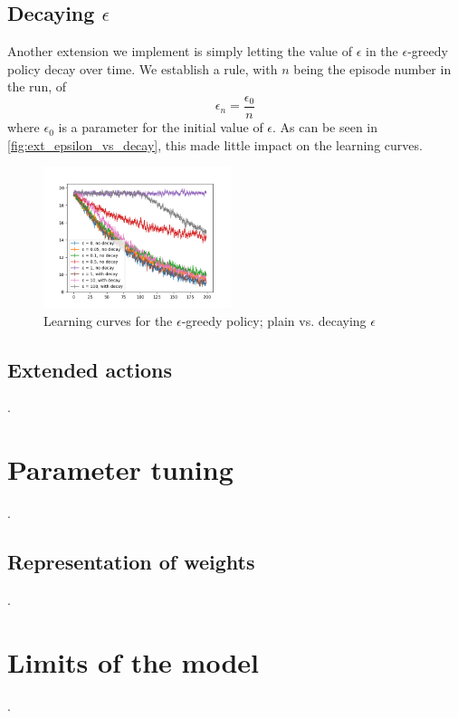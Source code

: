 \documentclass[a4paper, 11pt, twocolumn, final]{article} %
\begin{document}
\subsection{Decaying $\epsilon$} Another extension we implement is simply
letting the value of $\epsilon$ in the $\epsilon$-greedy policy decay over time.
We establish a rule, with $n$ being the episode number in the run, of
\begin{equation}
  \epsilon_n = \frac{\epsilon_0}{n}
\end{equation}
where $\epsilon_0$ is a parameter for the initial value of $\epsilon$.  As can
be seen in \autoref{fig:ext_epsilon_vs_decay}, this made little impact on the
learning curves.


\begin{figure}
  \includegraphics[width=0.49\textwidth]{figures/epsilon_decay.png}
  \caption{Learning curves for the $\epsilon$-greedy policy; plain vs. decaying
  $\epsilon$}
  \label{fig:ext_epsilon_vs_decay}
\end{figure}

\subsection{Extended actions} .

\section{Parameter tuning} .

\subsection{Representation of weights} .

\section{Limits of the model} .



\end{document}
